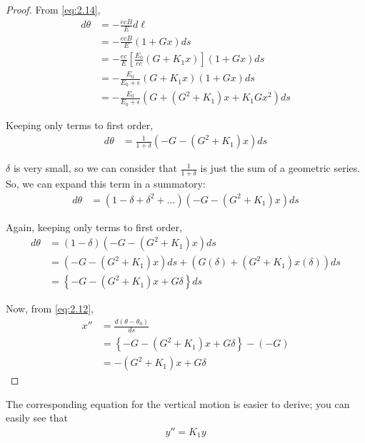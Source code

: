 \begin{proof}
	From \eqref{eq:2.14},
	\begin{align*}
		d\theta &= -\frac{ecB}{E}d\ell\\
				&= -\frac{ecB}{E}(1+Gx)ds\\
				&= -\frac{ec}{E}\left[\frac{E_0}{ec}(G+K_1x)\right](1+Gx)ds\\
				&= -\frac{E_0}{E_0+\epsilon}(G+K_1x)(1+Gx)ds\\
				&= -\frac{E_0}{E_0+\epsilon}(G+(G^2+K_1)x + K_1Gx^2)ds
	\end{align*}

    Keeping only terms to first order,
	\begin{align*}
		d\theta &= \frac{1}{1+\delta}(-G-(G^2+K_1)x)ds
	\end{align*}

	$\delta$ is very small, so we can consider that $\frac{1}{1+\delta}$ is just  the sum of a geometric series. So, we can expand this term in a summatory:
	\begin{align*}
		d\theta &= \left(1 - \delta + \delta^2+ ...\right)(-G-(G^2+K_1)x)ds
	\end{align*}

    Again, keeping only terms to first order,
	\begin{align*}
		d\theta &= \left(1 - \delta\right)(-G-(G^2+K_1)x)ds\\
				&= (-G-(G^2+K_1)x)ds + \left(G\left(\delta\right)+(G^2+K_1)x\left(\delta\right)\right)ds\\
				&= \left\{-G-(G^2+K_1)x + G\delta\right\}ds
	\end{align*}

	Now, from \eqref{eq:2.12},
	\begin{align*}
		x'' &= \frac{d(\theta-\theta_0)}{ds}\\
			&= \left\{-G-(G^2+K_1)x + G\delta\right\} - (-G)\\
			&= -(G^2+K_1)x + G\delta
	\end{align*}
\end{proof}

The corresponding equation for the vertical motion is easier to derive; you can easily see that
\begin{align}
	y'' = K_1 y
\end{align}

